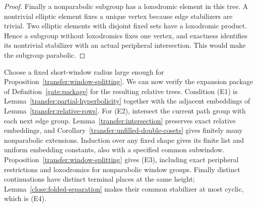 \begin{proof}
Finally a nonparabolic subgroup has a loxodromic element in this
tree. A nontrivial elliptic element fixes a unique vertex because
edge stabilizers are trivial. Two elliptic elements with disjoint
fixed sets have a loxodromic product. Hence a subgroup without
loxodromics fixes one vertex, and exactness identifies its nontrivial
stabilizer with an actual peripheral intersection. This would make
the subgroup parabolic.
\end{proof}

Choose a fixed short-window radius large enough for
Proposition~\ref{transfer:window-splitting}. We can now verify the
expansion package of Definition~\ref{gate:package} for the resulting
relative trees. Condition
\textup{(E1)} is Lemma~\ref{transfer:partial-hyperbolicity} together
with the adjacent embeddings of Lemma~\ref{transfer:relative-rows}.
For \textup{(E2)}, intersect the current path group with each next
edge group. Lemma~\ref{transfer:intersection} preserves exact relative
embeddings, and Corollary~\ref{transfer:unfilled-double-cosets} gives
finitely many nonparabolic extensions. Induction over any fixed shape
gives its finite list and uniform embedding constants, also with a
specified common subwindow. Proposition~\ref{transfer:window-splitting}
gives \textup{(E3)}, including exact peripheral restrictions and
loxodromics for nonparabolic window groups. Finally distinct
continuations have distinct terminal places at the same height;
Lemma~\ref{close:folded-separation} makes their common stabilizer at
most cyclic, which is \textup{(E4)}.

